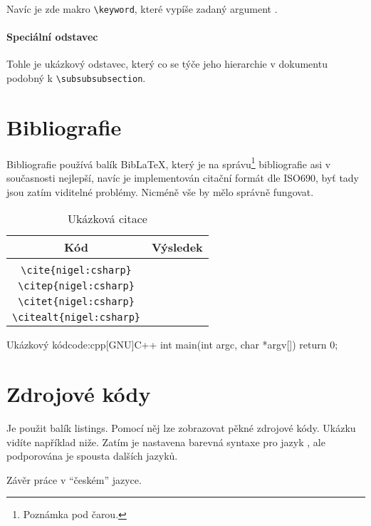 \documentclass[a4paper,12pt]{article}
\begin{document}
Navíc je zde makro \verb|\keyword|, které vypíše zadaný argument .

\paragraph{Speciální odstavec}
Tohle je ukázkový odstavec, který co se týče jeho hierarchie v dokumentu podobný k \verb|\subsubsubsection|.

\section{Bibliografie}
Bibliografie používá balík Bib\LaTeX, který je na správu\footnote{Poznámka pod čarou.} bibliografie asi v současnosti nejlepší, navíc je implementován citační formát dle ISO690, byť tady jsou zatím viditelné problémy. Nicméně vše by mělo správně fungovat.

\begin{table}
\caption{Ukázková citace}
\begin{center}
\begin{tabular}{c|l}
Kód & Výsledek \\
\hline \\
\verb|\cite{nigel:csharp}| & \cite{nigel:csharp} \\
\verb|\citep{nigel:csharp}| & \citep{nigel:csharp} \\
\verb|\citet{nigel:csharp}| & \citet{nigel:csharp} \\
\verb|\citealt{nigel:csharp}| & \citealt{nigel:csharp}
\end{tabular}
\end{center}
\end{table}

\begin{upcode}{Ukázkový \cpp kód}{code:cpp}{[GNU]C++}
int main(int argc, char *argv[]) {
	return 0;
}
\end{upcode}

\section{Zdrojové kódy}
Je použit balík listings. Pomocí něj lze zobrazovat pěkné zdrojové kódy. Ukázku vidíte například niže. Zatím je nastavena barevná syntaxe pro jazyk \cpp, ale podporována je spousta dalších jazyků.


\begin{upconclusions}[czech]
Závěr práce v \enquote{českém} jazyce.
\end{upconclusions}
\end{document}
